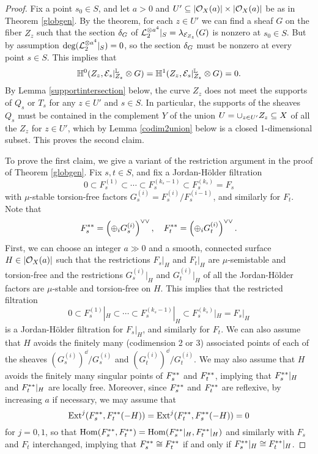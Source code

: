 \begin{proof}
Fix a point $s_0 \in S$, and let $a > 0$ and $U' \subseteq |\mathcal{O}_X(a)| \times |\mathcal{O}_X(a)|$ be as in Theorem \ref{globgen}. By the theorem, for each $z \in U'$ we can find a sheaf $G$ on the fiber $Z_z$ such that the section $\delta_G$ of $\mathcal{L}_2^{\otimes a^4}|_S = \lambda_{\mathcal{E}_{Z_z}}(G)$ is nonzero at $s_0 \in S$. But by assumption $\deg(\mathcal{L}_2^{\otimes a^4}|_S) = 0$, so the section $\delta_G$ must be nonzero at every point $s \in S$. This implies that
\[ \mathbb{H}^0(Z_z, \mathcal{E}_s|^{\mathbb{L}}_{Z_z} \otimes G) = \mathbb{H}^1(Z_z, \mathcal{E}_s|^{\mathbb{L}}_{Z_z} \otimes G) = 0. \]
By Lemma \ref{supportintersection} below, the curve $Z_z$ does not meet the supports of $Q_s$ or $T_s$ for any $z \in U'$ and $s \in S$. In particular, the supports of the sheaves $Q_s$ must be contained in the complement $Y$ of the union $U = \cup_{z \in U'} Z_z \subseteq X$ of all the $Z_z$ for $z \in U'$, which by Lemma \ref{codim2union} below is a closed 1-dimensional subset. This proves the second claim.

To prove the first claim, we give a variant of the restriction argument in the proof of Theorem \ref{globgen}. Fix $s, t \in S$, and fix a Jordan-H\"older filtration
\[ 0 \subset F_s^{(1)} \subset \cdots \subset F_s^{(k_s-1)} \subset F_s^{(k_s)} = F_s \]
with $\mu$-stable torsion-free factors $G_s^{(i)} = F_s^{(i)}/F_s^{(i-1)}$, and similarly for $F_t$. Note that 
\[ F_s^{\ast\ast} = \left(\oplus_i G_s^{(i)}\right)^{\vee\vee}, \quad F_t^{\ast\ast} = \left(\oplus_i G_t^{(i)}\right)^{\vee\vee}. \]
First, we can choose an integer $a \gg 0$ and a smooth, connected surface $H \in |\mathcal{O}_X(a)|$ such that the restrictions $F_s|_H$ and $F_t|_H$ are $\mu$-semistable and torsion-free \cite[Theorem 7.1.1]{HL} and the restrictions $G_s^{(i)}|_H$ and $G_t^{(i)}|_H$ of all the Jordan-H\"older factors are $\mu$-stable and torsion-free \cite[Theorem 7.2.8]{HL} on $H$. This implies that the restricted filtration
\[ 0 \subset F_s^{(1)}|_H \subset \cdots \subset F_s^{(k_s-1)}|_H \subset F_s^{(k_s)}|_H = F_s|_H \]
is a Jordan-H\"older filtration for $F_s|_H$, and similarly for $F_t$. We can also assume that $H$ avoids the finitely many (codimension 2 or 3) associated points of each of the sheaves $(G_s^{(i)})^\dd/G_s^{(i)}$ and $(G_t^{(i)})^\dd/G_t^{(i)}$. We may also assume that $H$ avoids the finitely many singular points of $F_s^{\ast\ast}$ and $F_t^{\ast\ast}$, implying that $F_s^{\ast\ast}|_H$ and $F_t^{\ast\ast}|_H$ are locally free. Moreover, since $F_s^{\ast\ast}$ and $F_t^{\ast\ast}$ are reflexive, by increasing $a$ if necessary, we may assume that 
\[ \mathrm{Ext}^j(F_s^{\ast\ast}, F_t^{\ast\ast}(-H)) = \mathrm{Ext}^j(F_t^{\ast\ast}, F_s^{\ast\ast}(-H)) = 0 \]
for $j = 0, 1$, so that $\mathrm{Hom}(F_s^{\ast\ast}, F_t^{\ast\ast}) = \mathrm{Hom}(F_s^{\ast\ast}|_H, F_t^{\ast\ast}|_H)$ and similarly with $F_s$ and $F_t$ interchanged, implying that $F_s^{\ast\ast} \cong F_t^{\ast\ast}$ if and only if $F_s^{\ast\ast}|_H \cong F_t^{\ast\ast}|_H$.


\end{proof}
